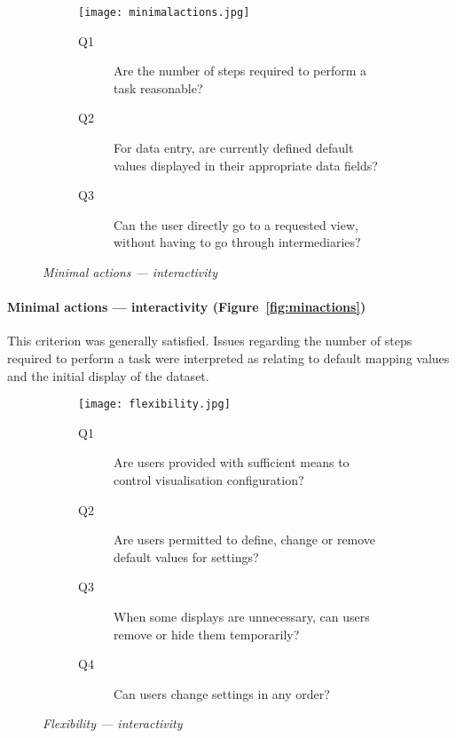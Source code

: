 \begin{figure}[!htb]
\centering
\begin{subfigure}{.5\textwidth}
	\centering
	\texttt{[image: minimalactions.jpg]}
\end{subfigure}%
\begin{subfigure}{.5\textwidth}
  \begin{description}
	\item[Q1]Are the number of steps required to perform a task reasonable?
	\item[Q2]For data entry, are currently defined default values displayed in their appropriate data fields?
	\item[Q3]Can the user directly go to a requested view, without having to go through intermediaries?
  \end{description}
\end{subfigure}
\caption{\textit{Minimal actions --- interactivity}}
\label{fig:minactions}
\end{figure}

\paragraph{Minimal actions --- interactivity (Figure~\vref{fig:minactions})}

This criterion was generally satisfied. Issues regarding the number of steps required to perform a task were interpreted as relating to default mapping values and the initial display of the dataset. 

\begin{figure}[!htb]
\centering
\begin{subfigure}{\textwidth}
	\centering
	\texttt{[image: flexibility.jpg]}
\end{subfigure}
\begin{subfigure}{\textwidth}
  \begin{description}
	\item[Q1]Are users provided with sufficient means to control visualisation configuration?
	\item[Q2]Are users permitted to define, change or remove default values for settings?
	\item[Q3]When some displays are unnecessary, can users remove or hide them temporarily?
	\item[Q4]Can users change settings in any order?
  \end{description}
\end{subfigure}
\caption{\textit{Flexibility --- interactivity}}
\label{fig:flexibility}
\end{figure}

